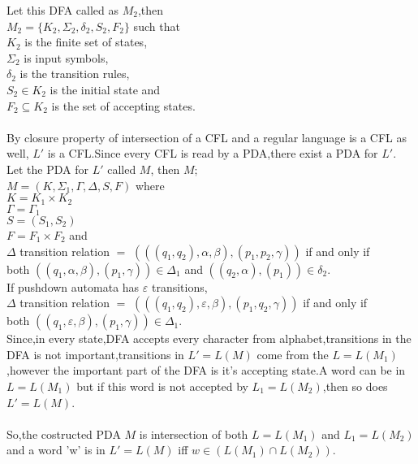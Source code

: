 \documentclass[a4paper,12pt]{article}
\begin{document}
\begin{tcolorbox}
Let this DFA called as $M_2$,then\\
$M_2=\{K_2,\Sigma_2,\delta_2,S_2,F_2\}$  such that \\
$K_2$ is the finite set of states,\\
$\Sigma_2$ is input symbols,\\
$\delta_2$ is the transition rules,\\
$S_2\in K_2$ is the initial state and\\
$F_2\subseteq K_2$ is the set of accepting states.\\\\

By closure property of intersection of a CFL and a regular language is a CFL as well, $L'$ is a CFL.Since every CFL is read by a PDA,there exist a PDA for $L'$.\\
Let the PDA for $L'$ called $M$, then $M$;\\
$M=(K,\Sigma_1,\Gamma,\Delta,S,F)$ where \\
$K=K_1\times K_2$\\
$\Gamma = \Gamma_1$\\
$S=(S_1,S_2)$ \\
$F = F_1 \times F_2$ and \\
$\Delta$ transition relation $=$ $(((q_1,q_2),\alpha,\beta),(p_1,p_2,\gamma))$ if and only if \\ both $((q_1,\alpha,\beta),(p_1,\gamma)) \in \Delta_1$  and $((q_2,\alpha),(p_1)) \in \delta_2$.\\
If pushdown automata has $\varepsilon$ transitions,\\
$\Delta$ transition relation $=$ $(((q_1,q_2),\varepsilon,\beta),(p_1,q_2,\gamma))$ if and only if\\
both $((q_1,\varepsilon,\beta),(p_1,\gamma)) \in \Delta_1$.\\Since,in every state,DFA accepts every character from alphabet,transitions in the DFA is not important,transitions  in $L'=L(M)$ come from the $L=L(M_1)$,however the important part of the DFA is it's accepting state.A word can be in $L=L(M_1)$ but if this word is not accepted by $L_1=L(M_2)$,then so does $L'=L(M)$.\\\\  
So,the costructed PDA $M$ is intersection of both $L=L(M_1)$ and $L_1=L(M_2)$ and  a word 'w' is in $L'=L(M)$ iff $w \in (L(M_1)\cap L(M_2))$.\\
   
\end{tcolorbox}
\end{document}
